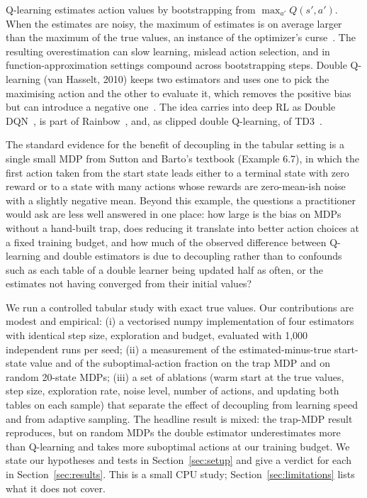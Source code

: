 Q-learning estimates action values by bootstrapping from $\max_{a'} Q(s',a')$. When the estimates are noisy, the maximum of estimates is on average larger than the maximum of the true values, an instance of the optimizer's curse~\cite{smith2006optimizer}. The resulting overestimation can slow learning, mislead action selection, and in function-approximation settings compound across bootstrapping steps. Double Q-learning (van Hasselt, 2010) keeps two estimators and uses one to pick the maximising action and the other to evaluate it, which removes the positive bias but can introduce a negative one~\cite{zhang2017weighted,ren2021estimation}. The idea carries into deep RL as Double DQN~\cite{hasselt2015deep}, is part of Rainbow~\cite{hessel2017rainbow}, and, as clipped double Q-learning, of TD3~\cite{fujimoto2018addressing}.

The standard evidence for the benefit of decoupling in the tabular setting is a single small MDP from Sutton and Barto's textbook (Example 6.7), in which the first action taken from the start state leads either to a terminal state with zero reward or to a state with many actions whose rewards are zero-mean-ish noise with a slightly negative mean. Beyond this example, the questions a practitioner would ask are less well answered in one place: how large is the bias on MDPs without a hand-built trap, does reducing it translate into better action choices at a fixed training budget, and how much of the observed difference between Q-learning and double estimators is due to decoupling rather than to confounds such as each table of a double learner being updated half as often, or the estimates not having converged from their initial values?

We run a controlled tabular study with exact true values. Our contributions are modest and empirical: (i) a vectorised numpy implementation of four estimators with identical step size, exploration and budget, evaluated with 1,000 independent runs per seed; (ii) a measurement of the estimated-minus-true start-state value and of the suboptimal-action fraction on the trap MDP and on random 20-state MDPs; (iii) a set of ablations (warm start at the true values, step size, exploration rate, noise level, number of actions, and updating both tables on each sample) that separate the effect of decoupling from learning speed and from adaptive sampling. The headline result is mixed: the trap-MDP result reproduces, but on random MDPs the double estimator underestimates more than Q-learning and takes more suboptimal actions at our training budget. We state our hypotheses and tests in Section~\ref{sec:setup} and give a verdict for each in Section~\ref{sec:results}. This is a small CPU study; Section~\ref{sec:limitations} lists what it does not cover.
